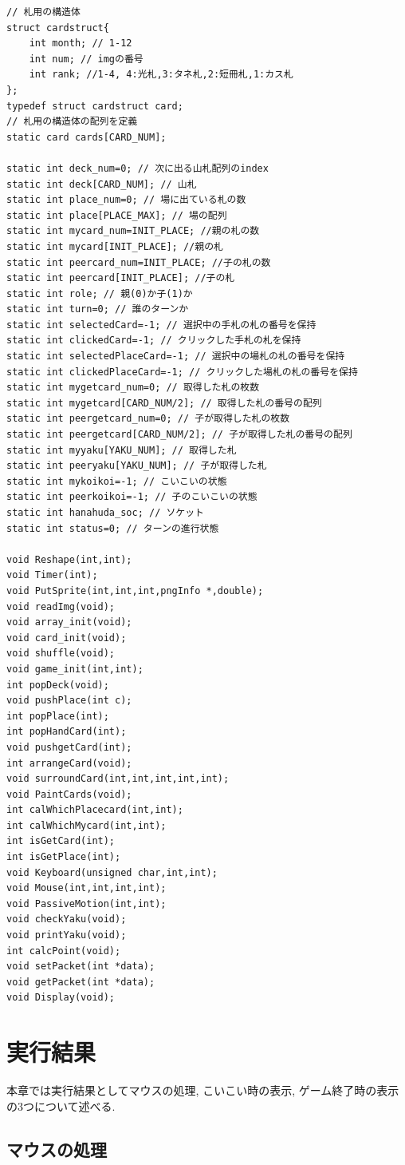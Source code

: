\documentclass[a4j]{jarticle}
\begin{document}
\begin{lstlisting}[basicstyle=\ttfamily\footnotesize, frame=single,label=hanahudah,caption=hanahuda.h]
// 札用の構造体
struct cardstruct{
    int month; // 1-12
    int num; // imgの番号
    int rank; //1-4, 4:光札,3:タネ札,2:短冊札,1:カス札
};
typedef struct cardstruct card;
// 札用の構造体の配列を定義
static card cards[CARD_NUM];

static int deck_num=0; // 次に出る山札配列のindex
static int deck[CARD_NUM]; // 山札
static int place_num=0; // 場に出ている札の数
static int place[PLACE_MAX]; // 場の配列
static int mycard_num=INIT_PLACE; //親の札の数
static int mycard[INIT_PLACE]; //親の札
static int peercard_num=INIT_PLACE; //子の札の数
static int peercard[INIT_PLACE]; //子の札 
static int role; // 親(0)か子(1)か
static int turn=0; // 誰のターンか
static int selectedCard=-1; // 選択中の手札の札の番号を保持
static int clickedCard=-1; // クリックした手札の札を保持 
static int selectedPlaceCard=-1; // 選択中の場札の札の番号を保持
static int clickedPlaceCard=-1; // クリックした場札の札の番号を保持
static int mygetcard_num=0; // 取得した札の枚数
static int mygetcard[CARD_NUM/2]; // 取得した札の番号の配列
static int peergetcard_num=0; // 子が取得した札の枚数
static int peergetcard[CARD_NUM/2]; // 子が取得した札の番号の配列
static int myyaku[YAKU_NUM]; // 取得した札
static int peeryaku[YAKU_NUM]; // 子が取得した札
static int mykoikoi=-1; // こいこいの状態
static int peerkoikoi=-1; // 子のこいこいの状態
static int hanahuda_soc; // ソケット
static int status=0; // ターンの進行状態

void Reshape(int,int);
void Timer(int);
void PutSprite(int,int,int,pngInfo *,double);
void readImg(void);
void array_init(void);
void card_init(void);
void shuffle(void);
void game_init(int,int);
int popDeck(void);
void pushPlace(int c);
int popPlace(int);
int popHandCard(int);
void pushgetCard(int);
int arrangeCard(void);
void surroundCard(int,int,int,int,int);
void PaintCards(void);
int calWhichPlacecard(int,int);
int calWhichMycard(int,int);
int isGetCard(int);
int isGetPlace(int);
void Keyboard(unsigned char,int,int);
void Mouse(int,int,int,int);
void PassiveMotion(int,int);
void checkYaku(void);
void printYaku(void);
int calcPoint(void);
void setPacket(int *data);
void getPacket(int *data);
void Display(void);
    \end{lstlisting}

    \section{実行結果}
    本章では実行結果としてマウスの処理, こいこい時の表示, ゲーム終了時の表示の3つについて述べる.
    \subsection{マウスの処理}
\end{document}
